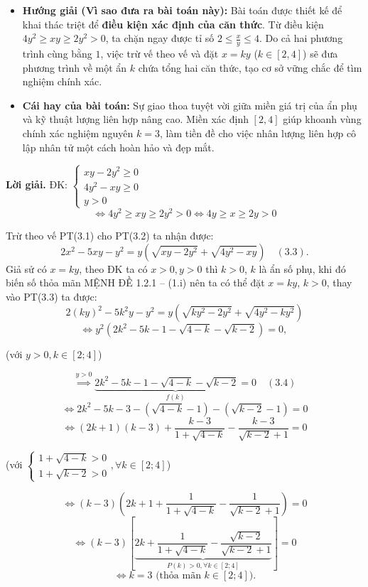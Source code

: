 \documentclass[12pt]{report}
\begin{document}
\begin{itemize}
    \item[\textbf{1.}] \textbf{Hướng giải (Vì sao đưa ra bài toán này):} 
    Bài toán được thiết kế để khai thác triệt để \textbf{điều kiện xác định của căn thức}. Từ điều kiện $4y^2 \ge xy \ge 2y^2 > 0$, ta chặn ngay được tỉ số $2 \le \frac{x}{y} \le 4$. Do cả hai phương trình cùng bằng $1$, việc trừ vế theo vế và đặt $x = ky$ ($k \in [2, 4]$) sẽ đưa phương trình về một ẩn $k$ chứa tổng hai căn thức, tạo cơ sở vững chắc để tìm nghiệm chính xác.

    \item[\textbf{2.}] \textbf{Cái hay của bài toán:} 
    Sự giao thoa tuyệt vời giữa miền giá trị của ẩn phụ và kỹ thuật lượng liên hợp nâng cao. Miền xác định $[2, 4]$ giúp khoanh vùng chính xác nghiệm nguyên $k=3$, làm tiền đề cho việc nhân lượng liên hợp cô lập nhân tử một cách hoàn hảo và đẹp mắt.
\end{itemize}
\vspace{0.2cm}
\noindent \textbf{Lời giải.} ĐK: $\begin{cases} xy - 2y^2 \geq 0 \\ 4y^2 - xy \geq 0 \\ y > 0 \end{cases}$
\[
\Leftrightarrow 4y^2 \geq xy \geq 2y^2 > 0 \Leftrightarrow 4y \geq x \geq 2y > 0
\]

\noindent Trừ theo vế PT(3.1) cho PT(3.2) ta nhận được:
\[
2x^2 - 5xy - y^2 = y(\sqrt{xy - 2y^2} + \sqrt{4y^2 - xy}) \quad (3.3).
\]
\noindent Giả sử có $x = ky$, theo ĐK ta có $x > 0, y > 0$ thì $k > 0$, $k$ là ẩn số phụ, khi đó biến số thỏa mãn MỆNH ĐỀ 1.2.1 -- (1.i) nên ta có thể đặt $x = ky$, $k > 0$, thay vào PT(3.3) ta được:
\[
2(ky)^2 - 5k^2y - y^2 = y(\sqrt{ky^2 - 2y^2} + \sqrt{4y^2 - ky^2})
\]
\[
\Leftrightarrow y^2(2k^2 - 5k - 1 - \sqrt{4 - k} - \sqrt{k - 2}) = 0\text{, }
\]
\centerline{(với $y > 0, k \in [2; 4]$)}
\[
\overset{y > 0}{\implies} \underbrace{2k^2 - 5k - 1 - \sqrt{4 - k} - \sqrt{k - 2} = 0}_{f(k)} \quad (3.4)
\]
\[
\Leftrightarrow 2k^2 - 5k - 3 - (\sqrt{4 - k} - 1) - (\sqrt{k - 2} - 1) = 0
\]
\[
\Leftrightarrow (2k + 1)(k - 3) + \dfrac{k - 3}{1 + \sqrt{4 - k}} - \dfrac{k - 3}{\sqrt{k - 2} + 1} = 0
\]
\centerline{\Big(với $\begin{cases} 1 + \sqrt{4 - k} > 0 \\ 1 + \sqrt{k - 2} > 0 \end{cases}, \forall k \in [2; 4]$\Big)}
\[
\Leftrightarrow (k - 3) \left( 2k + 1 + \dfrac{1}{1 + \sqrt{4 - k}} - \dfrac{1}{\sqrt{k - 2} + 1} \right) = 0
\]
\[
\Leftrightarrow (k - 3) \left[ \underbrace{2k + \dfrac{1}{1 + \sqrt{4 - k}} - \dfrac{\sqrt{k - 2}}{\sqrt{k - 2} + 1}}_{P(k) > 0, \forall k \in [2; 4]} \right] = 0
\]
\[
\Leftrightarrow k = 3\text{ (thỏa mãn } k \in [2; 4]\text{).}
\]
\end{document}
